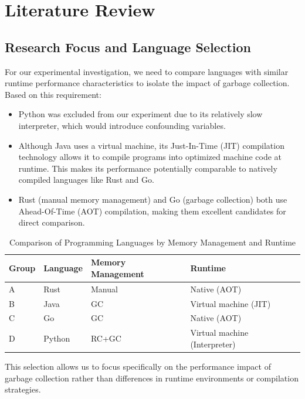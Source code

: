 \documentclass{article}
\begin{document}
\section{Literature Review}

\subsection{Research Focus and Language Selection}

For our experimental investigation, we need to compare languages with similar runtime performance characteristics to isolate the impact of garbage collection. Based on this requirement:

\begin{itemize}
    \item Python was excluded from our experiment due to its relatively slow interpreter, which would introduce confounding variables.
    \item Although Java uses a virtual machine, its Just-In-Time (JIT) compilation technology allows it to compile programs into optimized machine code at runtime. This makes its performance potentially comparable to natively compiled languages like Rust and Go.
    \item Rust (manual memory management) and Go (garbage collection) both use Ahead-Of-Time (AOT) compilation, making them excellent candidates for direct comparison.
\end{itemize}

\begin{table}[h]
  \centering
  \begin{tabular}{@{}llll@{}}
  \toprule
  Group & Language & Memory Management & Runtime \\
  \midrule
  A & Rust & Manual & Native (AOT) \\
  B & Java & GC & Virtual machine (JIT) \\
  C & Go & GC & Native (AOT) \\
  D & Python & RC+GC & Virtual machine (Interpreter) \\
  \bottomrule
  \end{tabular}
  \caption{Comparison of Programming Languages by Memory Management and Runtime }
  \end{table}

This selection allows us to focus specifically on the performance impact of garbage collection rather than differences in runtime environments or compilation strategies.

\end{document}
